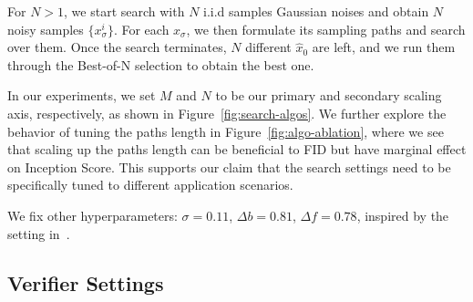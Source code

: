 \documentclass[11pt, letterpaper, logo]{googledeepmind}
\begin{document}
For $N > 1$, we start search with $N$ i.i.d samples Gaussian noises and obtain $N$ noisy samples $\{x_\sigma^i\}$. For each $x_\sigma$, we then formulate its sampling paths and search over them. Once the search terminates, $N$ different $\hat{x}_0$ are left, and we run them through the Best-of-N selection to obtain the best one.


In our experiments, we set $M$ and $N$ to be our primary and secondary scaling axis, respectively, as shown in Figure~\ref{fig:search-algos}. We further explore the behavior of tuning the paths length in Figure~\ref{fig:algo-ablation}, where we see that scaling up the paths length can be beneficial to FID but have marginal effect on Inception Score. This supports our claim that the search settings need to be specifically tuned to different application scenarios.


We fix other hyperparameters: $\sigma = 0.11$, $\Delta b = 0.81$, $\Delta f = 0.78$, inspired by the setting in~\citep{xu2023restart}.


\vspace{-0.25cm}
\subsection{Verifier Settings}
\end{document}
